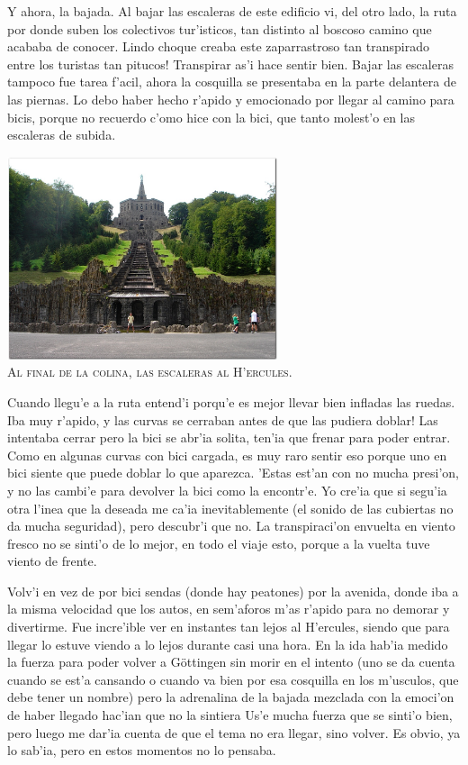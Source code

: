 Y ahora, la bajada. Al bajar las escaleras de este edificio vi, del otro lado,
la ruta por donde suben los colectivos tur'isticos, tan distinto al boscoso
camino que acababa de conocer. \textexclamdown Lindo choque creaba este
zaparrastroso tan transpirado entre los turistas tan pitucos! Transpirar as'i
hace sentir bien. Bajar las escaleras tampoco fue tarea f'acil, ahora la
cosquilla se presentaba en la parte delantera de las piernas. Lo debo haber
hecho r'apido y emocionado por llegar al camino para bicis, porque no recuerdo
c'omo hice con la bici, que tanto molest'o en las escaleras de subida.

\begin{center} \includegraphics[width=300px]{images/DSC01248.jpg}\\ \textsc{Al
final de la colina, las escaleras al H'ercules.} \end{center}

Cuando llegu'e a la ruta entend'i porqu'e es mejor llevar bien infladas las
ruedas. \textexclamdown Iba muy r'apido, y las curvas se cerraban antes de que
las pudiera doblar! Las intentaba cerrar pero la bici se abr'ia solita, ten'ia
que frenar para poder entrar. Como en algunas curvas con bici cargada, es muy
raro sentir eso porque uno en bici siente que puede doblar lo que aparezca.
'Estas est'an con no mucha presi'on, y no las cambi'e para devolver la bici como
la encontr'e. Yo cre'ia que si segu'ia otra l'inea que la deseada me ca'ia
inevitablemente (el sonido de las cubiertas no da mucha seguridad), pero
descubr'i que no. La transpiraci'on envuelta en viento fresco no se sinti'o de
lo mejor, en todo el viaje esto, porque a la vuelta tuve viento de frente.

Volv'i en vez de por bici sendas (donde hay peatones) por la avenida, donde iba
a la misma velocidad que los autos, en sem'aforos m'as r'apido para no demorar y
divertirme. Fue incre'ible ver en instantes tan lejos al H'ercules, siendo que
para llegar lo estuve viendo a lo lejos durante casi una hora. En la ida hab'ia
medido la fuerza para poder volver a G\"ottingen sin morir en el intento (uno se
da cuenta cuando se est'a cansando o cuando va bien por esa cosquilla en los
m'usculos, que debe tener un nombre) pero la adrenalina de la bajada mezclada
con la emoci'on de haber llegado hac'ian que no la sintiera Us'e mucha fuerza
que se sinti'o bien, pero luego me dar'ia cuenta de que el tema no era llegar,
sino volver. Es obvio, ya lo sab'ia, pero en estos momentos no lo pensaba.

